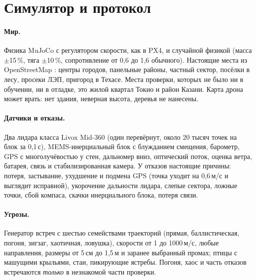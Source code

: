 \documentclass[10pt]{article}
\begin{document}
\section{Симулятор и протокол}\label{sec:sim}
\paragraph{Мир.} Физика MuJoCo \citep{todorov2012mujoco} с регулятором скорости, как в PX4, и случайной физикой (масса $\pm$15\,\%,
тяга $\pm$10\,\%, сопротивление от 0,6 до 1,6 обычного). Настоящие места из OpenStreetMap \citep{osm}: центры городов, панельные районы,
частный сектор, посёлки в лесу, просеки ЛЭП, пригород в Техасе. Места проверки, которых не было ни в обучении, ни в отладке,
это жилой квартал Токио и район Казани. Карта дрона может врать: нет здания, неверная высота, деревья не нанесены.
\paragraph{Датчики и отказы.} Два лидара класса Livox Mid-360 (один перевёрнут, около 20 тысяч точек на блок за 0,1\,с),
MEMS-инерциальный блок с блужданием смещения, барометр, GPS с многолучёвостью у стен, дальномер вниз, оптический поток, оценка
ветра, батарея, связь и стабилизированная камера. У отказов настоящие причины: потеря, застывание, ухудшение и подмена GPS
(точка уходит на 0,6\,м/с и выглядит исправной), укорочение дальности лидара, слепые сектора, ложные точки, сбой компаса,
скачки инерциального блока, потеря связи.
\paragraph{Угрозы.} Генератор встреч с шестью семействами траекторий (прямая, баллистическая, погоня, зигзаг, хаотичная,
ловушка), скорости от 1 до 1000\,м/с, любые направления, размеры от 5\,см до 1,5\,м и заранее выбранный промах; птицы с машущими
крыльями, стаи, пикирующие ястребы. Погоня, хаос и часть отказов встречаются \emph{только} в незнакомой части проверки.
\end{document}
